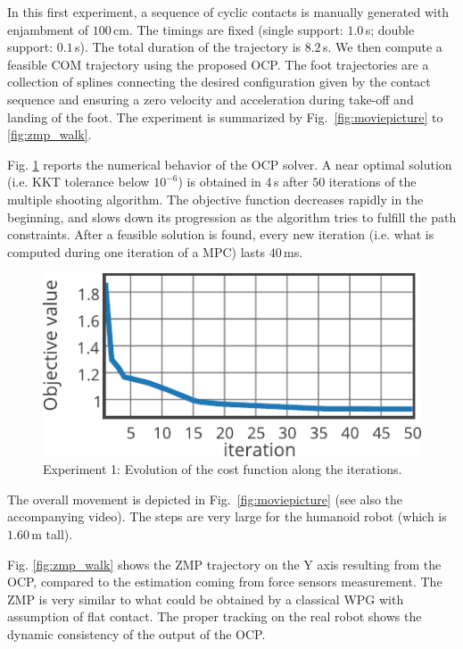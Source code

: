 In this first experiment, a sequence of cyclic contacts is manually generated with enjambment of $100\,$cm. The timings are fixed (single support: $1.0\,$s; double support: $0.1\,$s). The total duration of the trajectory is $8.2\,$s. We then compute a feasible COM trajectory using the proposed OCP. The foot trajectories are a collection of splines connecting the desired configuration given by the contact sequence and ensuring a zero velocity and acceleration during take-off and landing of the foot. 
The experiment is summarized by Fig.~\ref{fig:moviepicture} to \ref{fig:zmp_walk}.

Fig. \ref{fig:objective_walk} reports the numerical behavior of the OCP solver. A near optimal solution (i.e. KKT tolerance below $10^{-6}$) is obtained in $4\,$s after $50$ iterations of the multiple shooting algorithm. The objective function decreases rapidly in the beginning, and slows down its progression as the algorithm tries to fulfill the path constraints. After a feasible solution is found, every new iteration (i.e. what is computed during one iteration of a MPC) lasts $40\,$ms.
\begin{figure}[!ht]
	\centering
	\includegraphics[width=0.6\linewidth]{./fig/objective_function_walk.pdf}
		\caption{Experiment 1: Evolution of the cost function along the iterations.}
		\label{fig:objective_walk}
\end{figure}
The overall movement is depicted in Fig.~\ref{fig:moviepicture} (see also the accompanying video). The steps are very large for the humanoid robot (which is $1.60\,$m tall).

Fig. \ref{fig:zmp_walk} shows the ZMP trajectory on the Y axis resulting from the OCP, compared to the estimation coming from force sensors measurement. The ZMP is very similar to what could be obtained by a classical WPG with assumption of flat contact. The proper tracking on the real robot shows the dynamic consistency of the output of the OCP.


